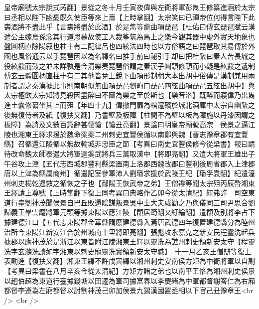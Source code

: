 皇帝廟號太宗說式芮翻】景從之冬十月壬寅夜偉與左衛將軍彭雋王修纂進酒於太宗曰丞相以陛下幽憂既久使臣等來上壽【上時掌翻】太宗笑曰已禪帝位何得言陛下此壽酒將不盡此乎【言夀將盡於此酒】於是雋等齎曲項琵琶【杜佑曰傅玄琵琶賦云漢遣公主嫁烏孫念其行道思慕故使工人裁筝筑為馬上之樂今觀其器中虛外實天地象也盤圓柄直除陽叙也柱十有二配律呂也四絃法四時也以方俗語之曰琵琶取其易傳於外國也風俗通云以手琵琶因以為名釋名曰推手前曰祕引手却曰把杜縶曰秦人苦長城之役絃鼗而鼔之並未詳孰是今清樂奏琵琶俗謂之秦漢子圓頭修頸而小疑是絃鼗之遺制傅玄云體圓柄直柱十有二其他皆兌上銳下曲項形制稍大本出胡中俗傳是漢制兼用兩制者謂之秦漢據此事則南朝似無曲項琵琶劉昫曰琵琶四絃曲項琵琶五絃出胡中】與太宗極飲太宗知將見殺因盡醉曰不圖為樂之至於斯也【樂音洛】既醉而寢偉乃出雋進土囊修纂坐其上而殂【年四十九】偉撤門扉為棺遷殯於城北酒庫中太宗自幽縶之後無復侍者及紙【復扶又翻】乃書壁及板障【柱間不為壁以板為障施以丹漆因謂之板障】為詩及文數百篇辭甚悽愴【愴丑亮翻】景諡曰明皇帝廟號高宗　侯景之逼江陵也湘東王繹求援於魏命梁秦二州刺史宜豐侯循以南鄭與魏【晉志豫章郡有宜豐縣】召循還江陵循以無故輸城非忠臣之節【考異曰南史宜豐侯修今從梁書】報曰請待改命魏太師泰遣大將軍達奚武將兵三萬取漢中【將即亮翻】又遣大將軍王雄出子午谷攻上津【五代志西城郡豐利縣梁置南上洛郡西魏改郡曰豐利後周省郡入上津郡唐以上津為縣屬商州】循遣記室參軍沛人劉璠求援於武陵王紀【璠孚袁翻】紀遣潼州刺史楊乾運救之循恢之子也【鄱陽王恢武帝之弟】王僧辯等聞太宗殂丙辰啓湘東王繹請上尊號【上時掌翻下復上同考異曰典略作乙卯今從太清紀】繹弗許　司空東道行臺劉神茂聞侯景自巴丘敗還隂謀叛景吳中士大夫咸勸之乃與儀同三司尹思合劉歸義王曅雲麾將軍元頵等據東陽以應江陵【頵居筠翻又紆綸翻】遣頵及别將李占下據建德江口【五代志東陽郡金華縣隋廢建德縣入焉唐武德四年復置建德縣分為睦州治所今東陽江新安江合於州城南十里將即亮翻】張彪攻永嘉克之新安民程靈洗起兵據郡以應神茂於是浙江以東皆附江陵湘東王繹以靈洗為譙州刺史領新安太守【程靈洗字玄滌洗讀如字湘東以刺史寵靈洗實領新安太守職】　十一月乙亥王僧辯等復上表勸進【復扶又翻】湘東王繹不許戊寅繹以湘州刺史安南侯方矩為中衛將軍以自副　【考異曰梁書在八月辛亥今從太清紀】方矩方諸之弟也以南平王恪為湘州刺史侯景以趙伯超為東道行臺據錢塘以田遷為軍司據富春以李慶緒為中軍都督謝答仁為右廂都督李遵為左廂都督以討劉神茂己卯加侯景九錫漢國置丞相以下官己丑豫章王<br />
<br />
